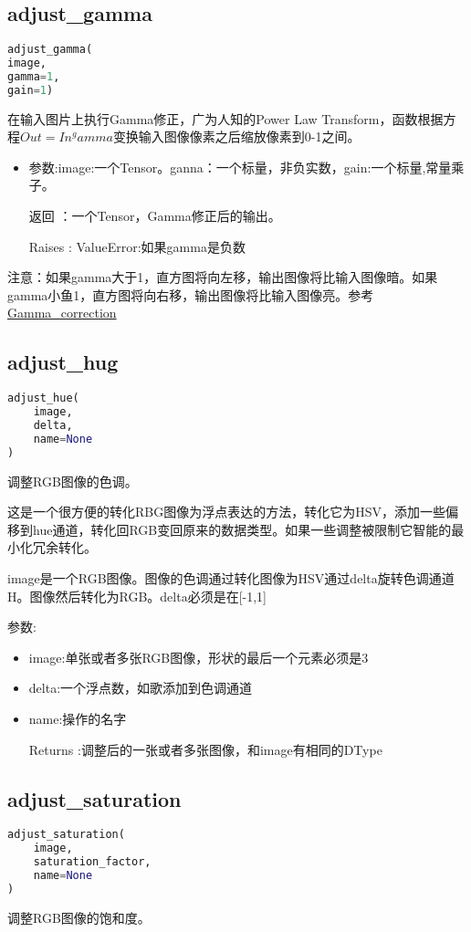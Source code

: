 \subsection{adjust\_gamma}
\begin{lstlisting}[language=Python]
adjust_gamma(
image,
gamma=1,
gain=1)
\end{lstlisting}
在输入图片上执行Gamma修正，广为人知的Power Law Transform，函数根据方程$Out=In^gamma$变换输入图像像素之后缩放像素到0-1之间。
\begin{itemize}
\item 参数:image:一个Tensor。ganna：一个标量，非负实数，gain:一个标量,常量乘子。
\item[返回]：一个Tensor，Gamma修正后的输出。
\item[Raises]: ValueError:如果gamma是负数
\end{itemize}
注意：如果gamma大于1，直方图将向左移，输出图像将比输入图像暗。如果gamma小鱼1，直方图将向右移，输出图像将比输入图像亮。参考\href{http://en.wikipedia.org/wiki/Gamma_correction}{Gamma\_correction}
\subsection{adjust\_hug}
\begin{lstlisting}[language=Python]
adjust_hue(
    image,
    delta,
    name=None
)
\end{lstlisting}
调整RGB图像的色调。

这是一个很方便的转化RBG图像为浮点表达的方法，转化它为HSV，添加一些偏移到hue通道，转化回RGB变回原来的数据类型。如果一些调整被限制它智能的最小化冗余转化。

image是一个RGB图像。图像的色调通过转化图像为HSV通过delta旋转色调通道H。图像然后转化为RGB。delta必须是在[-1,1]

参数:
\begin{itemize}
		\item image:单张或者多张RGB图像，形状的最后一个元素必须是3
		\item delta:一个浮点数，如歌添加到色调通道
		\item name:操作的名字
		\item[Returns]:调整后的一张或者多张图像，和image有相同的DType 
\end{itemize}
\subsection{adjust\_saturation}
\begin{lstlisting}[language=Python]
adjust_saturation(
    image,
    saturation_factor,
    name=None
)
\end{lstlisting}
调整RGB图像的饱和度。

